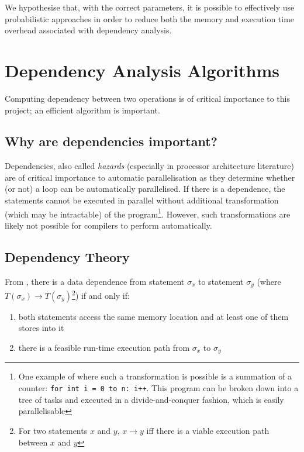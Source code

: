 	We hypothesise that, with the correct parameters, it is possible to effectively use probabilistic approaches in order to reduce both the memory and execution time overhead associated with dependency analysis.

\section{Dependency Analysis Algorithms} \label{sec:runtime/analysis}
	Computing dependency between two operations is of critical importance to this project; an efficient algorithm is important.
	
	\subsection{Why are dependencies important?} \label{runtime/analysis/why}
	Dependencies, also called \textit{hazards} (especially in processor architecture literature) are of critical importance to automatic parallelisation as they determine whether (or not) a loop can be automatically parallelised. If there is a dependence, the statements cannot be executed in parallel without additional transformation (which may be intractable) of the program\footnote{One example of where such a transformation is possible is a summation of a counter: \texttt{for int i = 0 to n: i++}. This program can be broken down into a tree of tasks and executed in a divide-and-conquer fashion, which is easily parallelisable}. However, such transformations are likely not possible for compilers to perform automatically. 
	
	\subsection{Dependency Theory} \label{sec:runtime/analysis/theory}
	From \citet[p.~37]{Allen2000}, there is a data dependence from statement $\sigma_x$ to statement $\sigma_y$ (where $T(\sigma_x) \rightarrow T(\sigma_y)$\footnote{For two statements $x$ and $y$, $x \rightarrow y$ iff there is a viable execution path between $x$ and $y$}) if and only if:
	
	\begin{enumerate}
		\item both statements access the same memory location and at least one of them stores into it
		\item there is a feasible run-time execution path from $\sigma_x$ to $\sigma_y$
	\end{enumerate}
	
